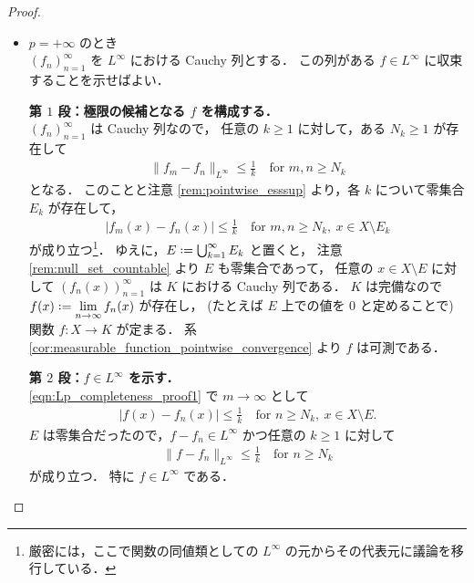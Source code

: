 \begin{proof}
    \leavevmode
    \begin{itemize}[leftmargin=\parindent]
    \item $p=+\infty$ のとき\\
        $(f_n)_{n=1}^\infty$ を $L^\infty$ における Cauchy 列とする．
        この列がある $f\in L^\infty$ に収束することを示せばよい．

        \textbf{第 $1$ 段：極限の候補となる $f$ を構成する．}\\
        $(f_n)_{n=1}^\infty$ は Cauchy 列なので，
        任意の $k\ge1$ に対して，ある $N_k\ge1$ が存在して
        \begin{align*}
            \|f_m-f_n\|_{L^\infty}\le\frac{1}{k}\quad\text{for $m,n\ge N_k$}
        \end{align*}
        となる．
        このことと注意 \ref{rem:pointwise_esssup} より，各 $k$ について零集合 $E_k$ が存在して，
        \begin{align}
            |f_m(x)-f_n(x)|\le\frac{1}{k}\quad\text{for $m,n\ge N_k,\ x\in X\setminus E_k$}
            \label{eqn:Lp_completeness_proof1}
        \end{align}
        が成り立つ\footnote{厳密には，ここで関数の同値類としての $L^\infty$ の元からその代表元に議論を移行している．}．
        ゆえに，$E\defeq\bigcup_{k=1}^\infty E_k$ と置くと，
        注意 \ref{rem:null_set_countable} より $E$ も零集合であって，
        任意の $x\in X\setminus E$ に対して $(f_n(x))_{n=1}^\infty$ は $K$ における Cauchy 列である．
        $K$ は完備なので $\displaystyle f(x)\defeq\lim_{n\to\infty}f_n(x)$ が存在し，
        (たとえば $E$ 上での値を $0$ と定めることで) 関数 $f:X\to K$ が定まる．
        系 \ref{cor:measurable_function_pointwise_convergence} より $f$ は可測である．

        \textbf{第 $2$ 段：$f\in L^\infty$ を示す．}\\
        \eqref{eqn:Lp_completeness_proof1} で $m\to\infty$ として
        \begin{align*}
            |f(x)-f_n(x)|\le\frac{1}{k}\quad\text{for $n\ge N_k,\ x\in X\setminus E$}.
        \end{align*}
        $E$ は零集合だったので，$f-f_n\in L^\infty$ かつ任意の $k\ge1$ に対して
        \begin{align}
            \|f-f_n\|_{L^\infty}\le\frac{1}{k}\quad\text{for $n\ge N_k$}
            \label{eqn:Lp_completeness_proof2}
        \end{align}
        が成り立つ．
        特に $f\in L^\infty$ である．


\end{itemize}
\end{proof}

